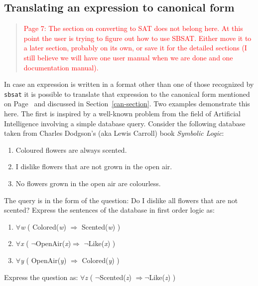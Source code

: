 \subsection{Translating an expression to canonical form}\label{xlate-section}

\begin{quotation}
\textcolor{red}{Page 7: The section on converting to SAT does not
belong here. At this point the user is trying to figure out how to
use SBSAT. Either move it to a later section, probably on its own,
or save it for the detailed sections (I still believe we will have
one user manual when we are done and one documentation manual).}
\end{quotation}
%

In case an expression is written in a format other than one of those
recognized by {\tt sbsat} it is possible to translate that expression
to the canonical form mentioned on Page~\pageref{can} and discussed in
Section~\ref{can-section}.  Two examples demonstrate this here. The
first is inspired by a well-known problem from the field of Artificial
Intelligence involving a simple database query.  Consider the
following database taken from Charles Dodgson's (aka Lewis Carroll)
book \emph{Symbolic Logic}:

{\baselineskip=0pt
\begin{enumerate}
\item Coloured flowers are always scented.
\item I dislike flowers that are not grown in the open air.
\item No flowers grown in the open air are colourless.
\end{enumerate}}

\noindent
The query is in the form of the question: Do I dislike all flowers
that are not scented?  Express the sentences of the database in first
order logic as:

\begin{enumerate}
\item[] $\forall$\emph{w} ( Colored(\emph{w}) $\Rightarrow$ Scented(\emph{w})
)
\item[] $\forall$\emph{x} ( $\neg$OpenAir(\emph{x})$\Rightarrow$ $\neg$Like(\emph{x})
)
\item[] $\forall$\emph{y} ( OpenAir(\emph{y}) $\Rightarrow$ Colored(\emph{y})
)
\end{enumerate}

\noindent
Express the question as: $\forall$\emph{z} ( $\neg$Scented(\emph{z})
$\Rightarrow$$\neg$Like(\emph{z}) )

